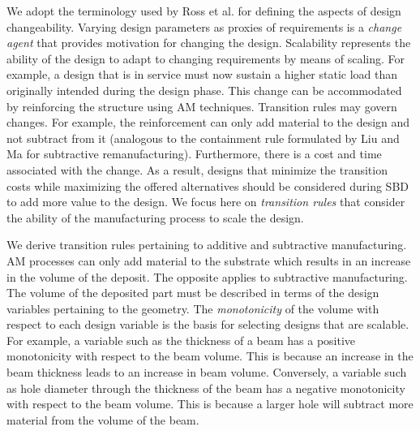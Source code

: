 We adopt the terminology used by Ross et al. \cite{Ross2008} for defining the aspects of design {changeability}. 
Varying design parameters as proxies of requirements is a \textit{change agent} that provides motivation for changing the design. {Scalability} represents the ability of the design to adapt to changing requirements by means of scaling. For example, a design that is in service must now sustain a higher static load than originally intended during the design phase. This change can be accommodated by reinforcing the structure using \ac{AM} techniques. Transition rules may govern changes. For example, the reinforcement can only add material to the design and not subtract from it (analogous to the containment rule formulated by Liu and Ma \cite{Liu2017} for subtractive remanufacturing). Furthermore, there is a cost and time associated with the change. As a result, designs that minimize the transition costs while maximizing the offered alternatives should be considered during \ac{SBD} to add more value to the design. We focus here on \textit{transition rules} that consider the ability of the manufacturing process to scale the design.

We derive transition rules pertaining to additive and subtractive manufacturing. \ac{AM} processes can only add material to the substrate which results in an increase in the volume of the deposit. The opposite applies to subtractive manufacturing. The volume of the deposited part must be described in terms of the design variables pertaining to the geometry. The \textit{monotonicity} of the volume with respect to each design variable is the basis for selecting designs that are scalable. For example, a variable such as the thickness of a beam has a positive monotonicity with respect to the beam volume. This is because an increase in the beam thickness leads to an increase in beam volume. Conversely, a variable such as hole diameter through the thickness of the beam has a negative monotonicity with respect to the beam volume. This is because a larger hole will subtract more material from the volume of the beam.


